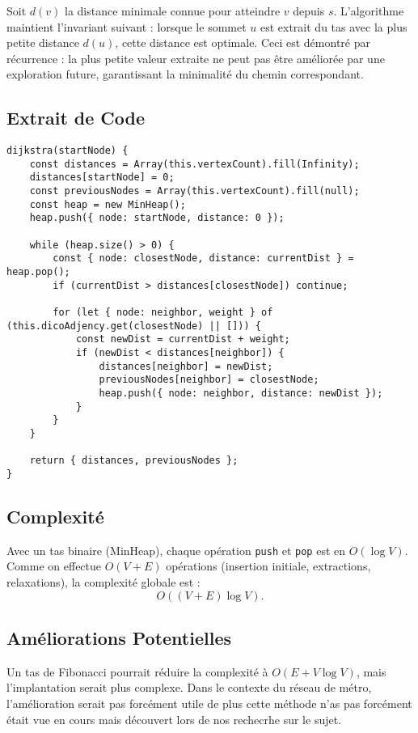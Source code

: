 \documentclass[a4paper,12pt]{article}
\begin{document}
Soit $d(v)$ la distance minimale connue pour atteindre $v$ depuis $s$. L’algorithme maintient l’invariant suivant : lorsque le sommet $u$ est extrait du tas avec la plus petite distance $d(u)$, cette distance est optimale. Ceci est démontré par récurrence : la plus petite valeur extraite ne peut pas être améliorée par une exploration future, garantissant la minimalité du chemin correspondant.

\subsection{Extrait de Code}

\begin{verbatim}
dijkstra(startNode) {
    const distances = Array(this.vertexCount).fill(Infinity);
    distances[startNode] = 0;
    const previousNodes = Array(this.vertexCount).fill(null);
    const heap = new MinHeap();
    heap.push({ node: startNode, distance: 0 });

    while (heap.size() > 0) {
        const { node: closestNode, distance: currentDist } = heap.pop();
        if (currentDist > distances[closestNode]) continue;

        for (let { node: neighbor, weight } of (this.dicoAdjency.get(closestNode) || [])) {
            const newDist = currentDist + weight;
            if (newDist < distances[neighbor]) {
                distances[neighbor] = newDist;
                previousNodes[neighbor] = closestNode;
                heap.push({ node: neighbor, distance: newDist });
            }
        }
    }

    return { distances, previousNodes };
}
\end{verbatim}

\subsection{Complexité}

Avec un tas binaire (MinHeap), chaque opération \texttt{push} et \texttt{pop} est en $O(\log V)$. Comme on effectue $O(V+E)$ opérations (insertion initiale, extractions, relaxations), la complexité globale est :
\[
O((V+E)\log V).
\]

\subsection{Améliorations Potentielles}

Un tas de Fibonacci pourrait réduire la complexité à $O(E + V\log V)$, mais l'implantation serait plus complexe. Dans le contexte du réseau de métro, l’amélioration serait pas forcément utile de plus cette méthode n'as pas forcément était vue en cours mais découvert lors de nos rechecrhe sur le sujet.
\end{document}

